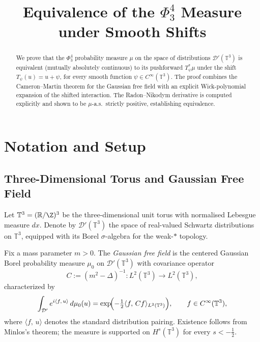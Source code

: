 \documentclass[11pt,a4paper]{article}
\theoremstyle{plain}
\theoremstyle{definition}
\newcommand{\T}{\mathbb{T}}
\newcommand{\R}{\mathbb{R}}
\newcommand{\cD}{\mathcal{D}}
\newcommand{\ip}[2]{\langle #1,\,#2\rangle}
\begin{document}
\title{Equivalence of the $\Phi^4_3$ Measure under Smooth Shifts}
\author{}
\date{}
\maketitle

\begin{abstract}
We prove that the $\Phi^4_3$ probability measure $\mu$ on the space of distributions
$\cD'(\T^3)$ is equivalent (mutually absolutely continuous) to its pushforward $T_\psi^*\mu$
under the shift $T_\psi(u)=u+\psi$, for every smooth function $\psi\in C^\infty(\T^3)$.
The proof combines the Cameron--Martin theorem for the Gaussian free field with an explicit
Wick-polynomial expansion of the shifted interaction.  The Radon--Nikodym derivative is
computed explicitly and shown to be $\mu$-a.s.\ strictly positive, establishing equivalence.
\end{abstract}

\section{Notation and Setup}

\subsection{Three-Dimensional Torus and Gaussian Free Field}

Let $\T^3=(\R/\Z)^3$ be the three-dimensional unit torus with normalised Lebesgue measure $dx$.
Denote by $\cD'(\T^3)$ the space of real-valued Schwartz distributions on $\T^3$, equipped with
its Borel $\sigma$-algebra for the weak-$*$ topology.

Fix a mass parameter $m>0$.  The \emph{Gaussian free field} is the centered Gaussian Borel
probability measure $\mu_0$ on $\cD'(\T^3)$ with covariance operator
\begin{equation}\label{eq:covariance}
  C := (m^2 - \Delta)^{-1} : L^2(\T^3) \longrightarrow L^2(\T^3),
\end{equation}
characterized by
\begin{equation}\label{eq:char}
  \int_{\cD'} e^{i\ip{f}{u}}\,d\mu_0(u)
  = \exp\!\Bigl(-\tfrac{1}{2}\ip{f}{Cf}_{L^2(\T^3)}\Bigr),
  \qquad f\in C^\infty(\T^3),
\end{equation}
where $\ip{f}{u}$ denotes the standard distribution pairing.
Existence follows from Minlos's theorem; the measure is supported on $H^s(\T^3)$
for every $s < -\tfrac{1}{2}$.
\end{document}
